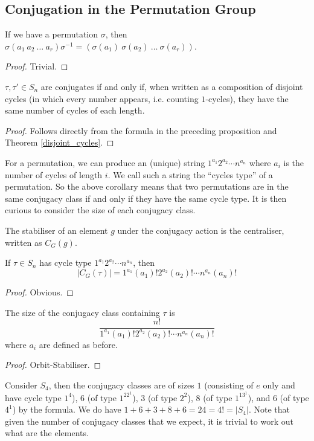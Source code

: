\subsection{Conjugation in the Permutation Group}
\begin{proposition}
    If we have a permutation $\sigma$, then $\sigma (a_1\ a_2\ \ldots\ a_r)\sigma^{-1}=(\sigma(a_1)\ \sigma(a_2)\ \ldots\ \sigma(a_r))$.
\end{proposition}
\begin{proof}
    Trivial.
\end{proof}
\begin{corollary}
    $\tau,\tau'\in S_n$ are conjugates if and only if, when written as a composition of disjoint cycles (in which every number appears, i.e. counting $1$-cycles), they have the same number of cycles of each length.
\end{corollary}
\begin{proof}
    Follows directly from the formula in the preceding proposition and Theorem \ref{disjoint_cycles}.
\end{proof}
For a permutation, we can produce an (unique) string $1^{a_1}2^{a_2}\cdots n^{a_n}$ where $a_i$ is the number of cycles of length $i$.
We call such a string the ``cycles type'' of a permutation.
So the above corollary means that two permutations are in the same conjugacy class if and only if they have the same cycle type.
It is then curious to consider the size of each conjugacy class.
\begin{definition}
    The stabiliser of an element $g$ under the conjugacy action is the centraliser, written as $C_G(g)$.
\end{definition}
\begin{lemma}
    If $\tau\in S_n$ has cycle type $1^{a_1}2^{a_2}\cdots n^{a_n}$, then
    $$|C_G(\tau)|=1^{a_1}(a_1)!2^{a_2}(a_2)!\cdots n^{a_n}(a_n)!$$
\end{lemma}
\begin{proof}
    Obvious.
\end{proof}
\begin{corollary}
    The size of the conjugacy class containing $\tau$ is
    $$\frac{n!}{1^{a_1}(a_1)!2^{a_2}(a_2)!\cdots n^{a_n}(a_n)!}$$
    where $a_i$ are defined as before.
\end{corollary}
\begin{proof}
    Orbit-Stabiliser.
\end{proof}
\begin{example}
    Consider $S_4$, then the conjugacy classes are of sizes $1$ (consisting of $e$ only and have cycle type $1^4$), $6$ (of type $1^22^1$), $3$ (of type $2^2$), $8$ (of type $1^13^1$), and $6$ (of type $4^1$) by the formula.
    We do have $1+6+3+8+6=24=4!=|S_4|$.
    Note that given the number of conjugacy classes that we expect, it is trivial to work out what are the elements.
\end{example}

